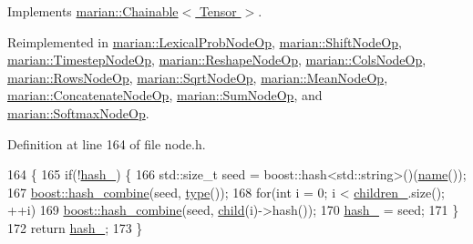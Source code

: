 Implements \hyperlink{classmarian_1_1Chainable_a5124cecc616150ff33fae3eff61e7372}{marian\+::\+Chainable$<$ Tensor $>$}.



Reimplemented in \hyperlink{structmarian_1_1LexicalProbNodeOp_af637f59c3fcdf6f2804685818661b1ca}{marian\+::\+Lexical\+Prob\+Node\+Op}, \hyperlink{structmarian_1_1ShiftNodeOp_a687a08ebcb58fc58deca832b226fe2dd}{marian\+::\+Shift\+Node\+Op}, \hyperlink{classmarian_1_1TimestepNodeOp_a43f50885f973fe1e849f1c940eeb2107}{marian\+::\+Timestep\+Node\+Op}, \hyperlink{classmarian_1_1ReshapeNodeOp_a629e7d06a0a137b9b6dd9343619ac860}{marian\+::\+Reshape\+Node\+Op}, \hyperlink{structmarian_1_1ColsNodeOp_a4ca2bfb0920d3b4e3d2439445c1bc75d}{marian\+::\+Cols\+Node\+Op}, \hyperlink{structmarian_1_1RowsNodeOp_ab673a759e07f33c57da2bb4e02082b25}{marian\+::\+Rows\+Node\+Op}, \hyperlink{structmarian_1_1SqrtNodeOp_a83836f4ce180733221a17b5af8e2db58}{marian\+::\+Sqrt\+Node\+Op}, \hyperlink{structmarian_1_1MeanNodeOp_a9cffc1e5e7ccf48c08cba8ec8432bebb}{marian\+::\+Mean\+Node\+Op}, \hyperlink{structmarian_1_1ConcatenateNodeOp_ade186966864e82498336129c608ab280}{marian\+::\+Concatenate\+Node\+Op}, \hyperlink{structmarian_1_1SumNodeOp_ab58aedc0c1c6929f45e7fc7a4ad3ab17}{marian\+::\+Sum\+Node\+Op}, and \hyperlink{structmarian_1_1SoftmaxNodeOp_a97692b03bf740a4759f906303bbfd2e1}{marian\+::\+Softmax\+Node\+Op}.



Definition at line 164 of file node.\+h.


\begin{DoxyCode}
164                         \{
165     \textcolor{keywordflow}{if}(!\hyperlink{structmarian_1_1NaryNodeOp_a12df8e3c447151b8169926de5076ae7c}{hash\_}) \{
166       std::size\_t seed = boost::hash<std::string>()(\hyperlink{classmarian_1_1Node_ad5437ac41eaa8316791698db9ad46ab0}{name}());
167       \hyperlink{bpe_8h_a04cc1b733a2f4d205f13f7a59facba64}{boost::hash\_combine}(seed, \hyperlink{classmarian_1_1Chainable_a2b7a5cbdac7a7d3bd7d781a6ff148fc3}{type}());
168       \textcolor{keywordflow}{for}(\textcolor{keywordtype}{int} i = 0; i < \hyperlink{classmarian_1_1Node_a4d44ab201d96c0f283188bcc91f64b1d}{children\_}.size(); ++i)
169         \hyperlink{bpe_8h_a04cc1b733a2f4d205f13f7a59facba64}{boost::hash\_combine}(seed, \hyperlink{classmarian_1_1Node_a71a9c8ad6ba12d421fa97222d74a90b9}{child}(i)->hash());
170       \hyperlink{structmarian_1_1NaryNodeOp_a12df8e3c447151b8169926de5076ae7c}{hash\_} = seed;
171     \}
172     \textcolor{keywordflow}{return} \hyperlink{structmarian_1_1NaryNodeOp_a12df8e3c447151b8169926de5076ae7c}{hash\_};
173   \}
\end{DoxyCode}


